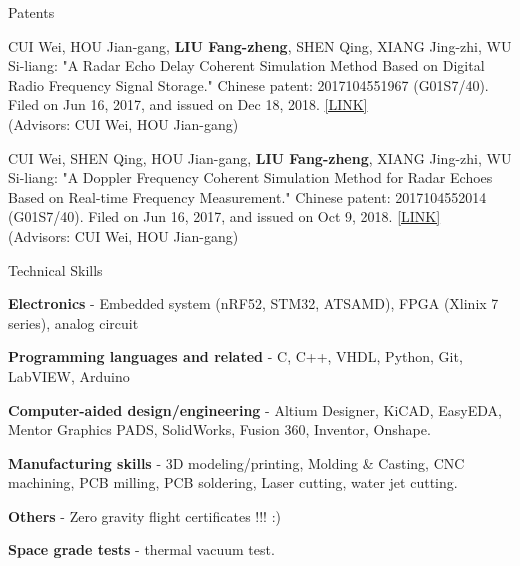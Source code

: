 \documentclass{resume} %
\begin{document}
%
\begin{rSection}{Patents}

\begin{itemlabel}
\item CUI Wei, HOU Jian-gang, \textbf{LIU Fang-zheng}, SHEN Qing, XIANG Jing-zhi, WU Si-liang: "A Radar Echo Delay Coherent Simulation Method Based on Digital Radio Frequency Signal Storage." Chinese patent: 2017104551967 (G01S7/40). Filed on Jun 16, 2017, and issued on Dec 18, 2018. \href{http://www.zlqiao.com/zlqiao/patent-f0301af6125548659bae9e05ed9543d6.html}{[LINK]}\\
(Advisors: CUI Wei, HOU Jian-gang)
\smallskip
\smallskip
\smallskip
\item CUI Wei, SHEN Qing, HOU Jian-gang, \textbf{LIU Fang-zheng}, XIANG Jing-zhi, WU Si-liang: "A Doppler Frequency Coherent Simulation Method for Radar Echoes Based on Real-time Frequency Measurement." Chinese patent: 2017104552014 (G01S7/40). Filed on Jun 16, 2017, and issued on Oct 9, 2018. \href{http://www.zlqiao.com/zlqiao/patent-4dc7dd85795d40a08320e507561834ca.html}{[LINK]}\\
(Advisors: CUI Wei, HOU Jian-gang)
\end{itemlabel}
\end{rSection}

%


\begin{rSection}{Technical Skills}

\begin{itemlabel}

\item \textbf{Electronics} - Embedded system (nRF52, STM32, ATSAMD), FPGA (Xlinix 7 series), analog circuit
\smallskip
\smallskip

\item \textbf{Programming languages and related} - C, C++, VHDL, Python, Git, LabVIEW, Arduino
\smallskip
\smallskip

\item \textbf{Computer-aided design/engineering} - Altium Designer, KiCAD, EasyEDA, Mentor Graphics PADS, SolidWorks, Fusion 360, Inventor, Onshape.
\smallskip
\smallskip

\item \textbf{Manufacturing skills} - 3D modeling/printing, Molding \& Casting, CNC machining, PCB milling, PCB soldering, Laser cutting, water jet cutting.
\smallskip
\smallskip

\item \textbf{Others} - Zero gravity flight certificates !!! :)
\smallskip
\smallskip

\item \textbf{Space grade tests} - thermal vacuum test.
\end{itemlabel}
\end{rSection}
\end{document}

